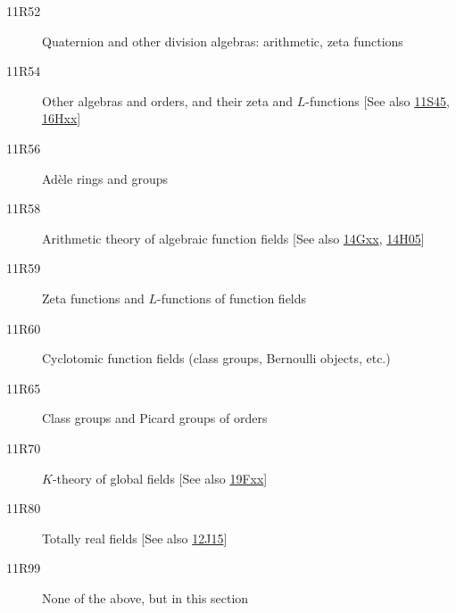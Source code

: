 \documentclass[letterpaper]{article}
\begin{document}
\begin{description}
\item [11R52]\label{11R52} Quaternion and other division algebras: arithmetic, zeta functions
\item [11R54]\label{11R54} Other algebras and orders, and their zeta and $L$-functions [See also \hyperref[11S45]{11S45}, \hyperref[16Hxx]{16Hxx}]
\item [11R56]\label{11R56} Ad\`{e}le rings and groups
\item [11R58]\label{11R58} Arithmetic theory of algebraic function fields [See also \hyperref[14Gxx]{14Gxx}, \hyperref[14H05]{14H05}]
\item [11R59]\label{11R59} Zeta functions and $L$-functions of function fields
\item [11R60]\label{11R60} Cyclotomic function fields (class groups, Bernoulli objects, etc.)
\item [11R65]\label{11R65} Class groups and Picard groups of orders
\item [11R70]\label{11R70} $K$-theory of global fields [See also \hyperref[19Fxx]{19Fxx}]
\item [11R80]\label{11R80} Totally real fields [See also \hyperref[12J15]{12J15}]
\item [11R99]\label{11R99} None of the above, but in this section
\end{description}
\end{document}
